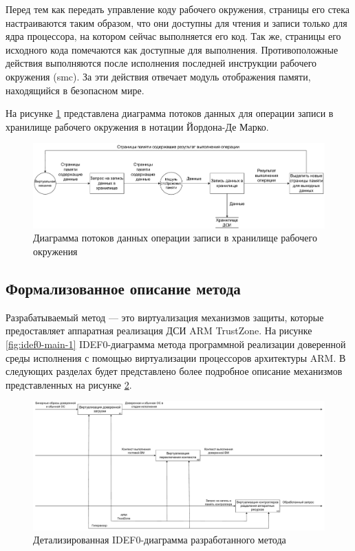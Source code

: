 Перед тем как передать управление коду рабочего окружения, страницы его стека настраиваются таким образом, что они доступны для чтения и записи только для ядра процессора, на котором сейчас выполняется его код. Так же, страницы его исходного кода помечаются как доступные для выполнения. Противоположные действия выполняются после исполнения последней инструкции рабочего окружения (smc). За эти действия отвечает модуль отображения памяти, находящийся в безопасном мире.

На рисунке \ref{fig:ciee} представлена диаграмма потоков данных для операции записи в хранилище рабочего окружения в нотации Йордона-Де Марко.

\begin{figure}[h!]
	\centering
	\includegraphics[width=\textwidth]{img/dfd-ciee.pdf}
	\caption{Диаграмма потоков данных операции записи в хранилище рабочего окружения}
	\label{fig:ciee}
\end{figure}

\subsection{Формализованное описание метода}

Разрабатываемый метод --- это виртуализация механизмов защиты, которые предоставляет аппаратная реализация ДСИ ARM TrustZone. На рисунке \ref{fig:idef0-main-1} IDEF0-диаграмма метода программной реализации доверенной среды исполнения с помощью виртуализации процессоров архитектуры ARM. В следующих разделах будет представлено более подробное описание механизмов представленных на рисунке \ref{fig:idef0-main-2}.

\begin{figure}[h!]
	\centering
	\includegraphics[width=\textwidth]{img/main-idef0-2.pdf}
	\caption{Детализированная IDEF0-диаграмма разработанного метода}
	\label{fig:idef0-main-2}
\end{figure}

